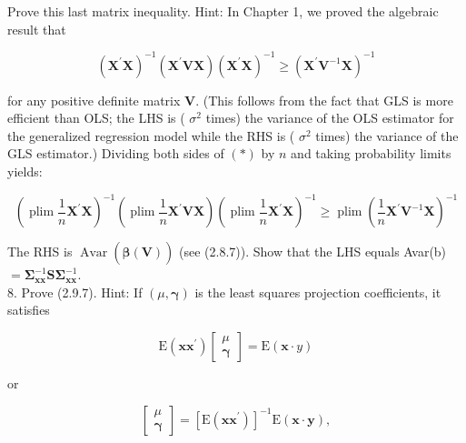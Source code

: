 \documentclass[10pt]{article}
\begin{document}
Prove this last matrix inequality. Hint: In Chapter 1, we proved the algebraic\\
result that


\begin{equation*}
\left(\mathbf{X}^{\prime} \mathbf{X}\right)^{-1}\left(\mathbf{X}^{\prime} \mathbf{V} \mathbf{X}\right)\left(\mathbf{X}^{\prime} \mathbf{X}\right)^{-1} \geq\left(\mathbf{X}^{\prime} \mathbf{V}^{-1} \mathbf{X}\right)^{-1} \tag{*}
\end{equation*}


for any positive definite matrix $\mathbf{V}$. (This follows from the fact that GLS is more efficient than OLS; the LHS is ( $\sigma^{2}$ times) the variance of the OLS estimator for the generalized regression model while the RHS is ( $\sigma^{2}$ times) the variance of the GLS estimator.) Dividing both sides of $(*)$ by $n$ and taking probability limits yields:


\begin{equation*}
\left(\operatorname{plim} \frac{1}{n} \mathbf{X}^{\prime} \mathbf{X}\right)^{-1}\left(\operatorname{plim} \frac{1}{n} \mathbf{X}^{\prime} \mathbf{V} \mathbf{X}\right)\left(\operatorname{plim} \frac{1}{n} \mathbf{X}^{\prime} \mathbf{X}\right)^{-1} \geq \operatorname{plim}\left(\frac{1}{n} \mathbf{X}^{\prime} \mathbf{V}^{-1} \mathbf{X}\right)^{-1} \tag{**}
\end{equation*}


The RHS is $\operatorname{Avar}(\widehat{\boldsymbol{\beta}}(\mathbf{V}))$ (see (2.8.7)). Show that the LHS equals Avar(b) $= \boldsymbol{\Sigma}_{\mathbf{x x}}^{-1} \mathbf{S} \boldsymbol{\Sigma}_{\mathbf{x x}}^{-1}$.\\
8. Prove (2.9.7). Hint: If $(\mu, \boldsymbol{\gamma})$ is the least squares projection coefficients, it satisfies

\[
\mathrm{E}\left(\mathbf{x x}^{\prime}\right)\left[\begin{array}{l}
\mu  \tag{*}\\
\boldsymbol{\gamma}
\end{array}\right]=\mathrm{E}(\mathbf{x} \cdot y)
\]

or

\[
\left[\begin{array}{l}
\mu  \tag{**}\\
\boldsymbol{\gamma}
\end{array}\right]=\left[\mathrm{E}\left(\mathbf{x} \mathbf{x}^{\prime}\right)\right]^{-1} \mathrm{E}(\mathbf{x} \cdot \boldsymbol{y}),
\]
\end{document}

